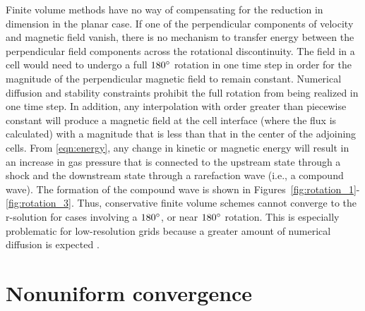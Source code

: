 Finite volume methods have no way of compensating for the reduction in dimension in the planar case.  If one of the perpendicular components of velocity and magnetic field vanish, there is no mechanism to transfer energy between the perpendicular field components across the rotational discontinuity.  The field in a cell would need to undergo a full $180^\circ$ rotation in one time step in order for the magnitude of the perpendicular magnetic field to remain constant.  Numerical diffusion and stability constraints prohibit the full rotation from being realized in one time step.  In addition, any interpolation with order greater than piecewise constant will produce a magnetic field at the cell interface (where the flux is calculated) with a magnitude that is less than that in the center of the adjoining cells.  From \eqref{eqn:energy}, any change in kinetic or magnetic energy will result in an increase in gas pressure that is connected to the upstream state through a shock and the downstream state through a rarefaction wave (i.e., a compound wave).  The formation of the compound wave is shown in Figures~\ref{fig:rotation_1}-\ref{fig:rotation_3}.  Thus, conservative finite volume schemes cannot converge to the r-solution for cases involving a $180^\circ$, or near $180^\circ$ rotation.  This is especially problematic for low-resolution grids because a greater amount of numerical diffusion is expected \citep{Barmin:1996,Torrilhon:2003b}.  

\section[Nonuniform convergence]{Nonuniform convergence}
\label{sec:nonuniform_converge}


